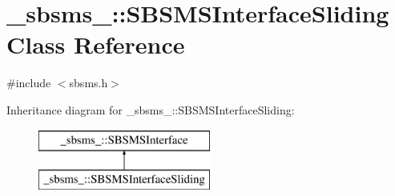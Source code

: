 \hypertarget{class__sbsms___1_1_s_b_s_m_s_interface_sliding}{}\section{\+\_\+sbsms\+\_\+\+:\+:S\+B\+S\+M\+S\+Interface\+Sliding Class Reference}
\label{class__sbsms___1_1_s_b_s_m_s_interface_sliding}


{\ttfamily \#include $<$sbsms.\+h$>$}

Inheritance diagram for \+\_\+sbsms\+\_\+\+:\+:S\+B\+S\+M\+S\+Interface\+Sliding\+:\begin{figure}[H]
\begin{center}
\leavevmode
\includegraphics[height=2.000000cm]{class__sbsms___1_1_s_b_s_m_s_interface_sliding}
\end{center}
\end{figure}
